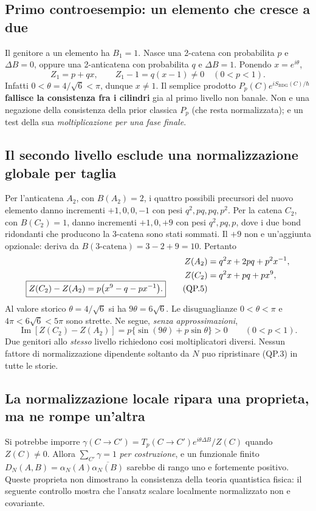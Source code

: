 \documentclass[11pt,a4paper]{article}
\begin{document}
\subsection*{Primo controesempio: un elemento che cresce a due}
Il genitore a un elemento ha $B_1=1$. Nasce una 2-catena con probabilita $p$ e $\Delta B=0$, oppure una 2-anticatena con probabilita $q$ e $\Delta B=1$. Ponendo $x=e^{i\theta}$,
\begin{equation}
 \boxed{Z_1=p+qx,\qquad Z_1-1=q(x-1)\ne0\quad(0<p<1).}\tag{QP.4}
\end{equation}
Infatti $0<\theta=4/\sqrt6<\pi$, dunque $x\ne1$. Il semplice prodotto $P_p(C)e^{iS_{\mathrm{BDG}}(C)/\hbar}$ \textbf{fallisce la consistenza fra i cilindri} gia al primo livello non banale. Non e una negazione della consistenza della prior classica $P_p$ (che resta normalizzata); e un test della sua \emph{moltiplicazione per una fase finale}.

\subsection*{Il secondo livello esclude una normalizzazione globale per taglia}
Per l'anticatena $A_2$, con $B(A_2)=2$, i quattro possibili precursori del nuovo elemento danno incrementi $+1,0,0,-1$ con pesi $q^2,pq,pq,p^2$. Per la catena $C_2$, con $B(C_2)=1$, danno incrementi $+1,0,+9$ con pesi $q^2,pq,p$, dove i due bond ridondanti che producono la 3-catena sono stati sommati. Il $+9$ non e un'aggiunta opzionale: deriva da $B(\text{3-catena})=3-2+9=10$. Pertanto
\begin{align}
 Z(A_2)&=q^2x+2pq+p^2x^{-1},\notag\\
 Z(C_2)&=q^2x+pq+px^9,\\[-0.4em]
 \boxed{Z(C_2)-Z(A_2)=p\bigl(x^9-q-px^{-1}\bigr).}\tag{QP.5}
\end{align}
Al valore storico $\theta=4/\sqrt6$ si ha $9\theta=6\sqrt6$. Le disuguaglianze $0<\theta<\pi$ e $4\pi<6\sqrt6<5\pi$ sono strette. Ne segue, \emph{senza approssimazioni},
\begin{equation}
 \boxed{\operatorname{Im}[Z(C_2)-Z(A_2)]
 =p\{\sin(9\theta)+p\sin\theta\}>0\qquad(0<p<1).}\tag{QP.6}
\end{equation}
Due genitori allo \emph{stesso} livello richiedono cosi moltiplicatori diversi. Nessun fattore di normalizzazione dipendente soltanto da $N$ puo ripristinare (QP.3) in tutte le storie.

\subsection*{La normalizzazione locale ripara una proprieta, ma ne rompe un'altra}
Si potrebbe imporre $\gamma(C\to C')=T_p(C\to C')e^{i\theta\Delta B}/Z(C)$ quando $Z(C)\ne0$. Allora $\sum_{C'}\gamma=1$ \emph{per costruzione}, e un funzionale finito $D_N(A,B)=\alpha_N(A)\overline{\alpha_N(B)}$ sarebbe di rango uno e fortemente positivo. Queste proprieta non dimostrano la consistenza della teoria quantistica fisica: il seguente controllo mostra che l'ansatz scalare localmente normalizzato non e covariante.
\end{document}
